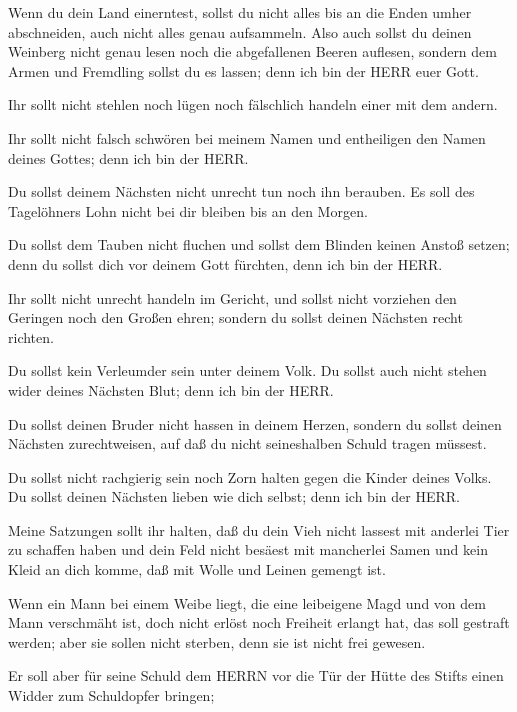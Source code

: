  Wenn du dein Land einerntest, sollst du nicht alles bis an
die Enden umher abschneiden, auch nicht alles genau aufsammeln.
 Also auch sollst du deinen Weinberg nicht genau lesen noch
die abgefallenen Beeren auflesen, sondern dem Armen und Fremdling sollst
du es lassen; denn ich bin der HERR euer Gott.

 Ihr sollt nicht stehlen noch lügen noch fälschlich handeln
einer mit dem andern.

 Ihr sollt nicht falsch schwören bei meinem Namen und
entheiligen den Namen deines Gottes; denn ich bin der HERR.

 Du sollst deinem Nächsten nicht unrecht tun noch ihn
berauben. Es soll des Tagelöhners Lohn nicht bei dir bleiben bis an den
Morgen.

 Du sollst dem Tauben nicht fluchen und sollst dem Blinden
keinen Anstoß setzen; denn du sollst dich vor deinem Gott fürchten, denn
ich bin der HERR.

 Ihr sollt nicht unrecht handeln im Gericht, und sollst
nicht vorziehen den Geringen noch den Großen ehren; sondern du sollst
deinen Nächsten recht richten.

 Du sollst kein Verleumder sein unter deinem Volk. Du
sollst auch nicht stehen wider deines Nächsten Blut; denn ich bin der
HERR.

 Du sollst deinen Bruder nicht hassen in deinem Herzen,
sondern du sollst deinen Nächsten zurechtweisen, auf daß du nicht
seineshalben Schuld tragen müssest.

 Du sollst nicht rachgierig sein noch Zorn halten gegen die
Kinder deines Volks. Du sollst deinen Nächsten lieben wie dich selbst;
denn ich bin der HERR.

 Meine Satzungen sollt ihr halten, daß du dein Vieh nicht
lassest mit anderlei Tier zu schaffen haben und dein Feld nicht besäest
mit mancherlei Samen und kein Kleid an dich komme, daß mit Wolle und
Leinen gemengt ist.

 Wenn ein Mann bei einem Weibe liegt, die eine leibeigene
Magd und von dem Mann verschmäht ist, doch nicht erlöst noch Freiheit
erlangt hat, das soll gestraft werden; aber sie sollen nicht sterben,
denn sie ist nicht frei gewesen.

 Er soll aber für seine Schuld dem HERRN vor die Tür der
Hütte des Stifts einen Widder zum Schuldopfer bringen;

